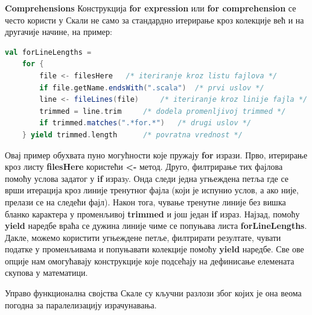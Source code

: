 \documentclass[12pt,oneside]{memoir}
\begin{document}
\begin{description}
\item \textbf{Comprehensions}
Конструкција \textbf{for expression} или \textbf{for comprehension} се често користи у Скали не само за стандардно итерирање кроз колекције већ и на другачије начине, на пример:
\begin{lstlisting}[language=Scala]
val forLineLengths =
	for {
		file <- filesHere 	/* iteriranje kroz listu fajlova */
		if file.getName.endsWith(".scala") 	/* prvi uslov */
		line <- fileLines(file) 	/* iteriranje kroz linije fajla */
		trimmed = line.trim 	/* dodela promenljivoj trimmed */
		if trimmed.matches(".*for.*") 	/* drugi uslov */
	} yield trimmed.length 		/* povratna vrednost */
\end{lstlisting}
Овај пример обухвата пуно могућности које пружају \textbf{for} изрази. Прво, итерирање кроз листу \textbf{filesHere} користећи \textbf{<-} метод. Друго, филтрирање тих фајлова помоћу услова задатог у \textbf{if} изразy. Онда следи једна угњеждена петља где се врши итерација кроз линије тренутног фајла (који је испунио услов, а ако није, прелази се на следећи фајл). Након тога, чување тренутне линије без вишка бланко карактера у променљивој \textbf{trimmed} и још један \textbf{if} израз. Најзад, помоћу \textbf{yield} наредбе враћа се дужина линије чиме се попуњава листа \textbf{forLineLengths}. Дакле, можемо користити угњеждене петље, филтрирати резултате, чувати податке у променљивама и попуњавати колекције помоћу \textbf{yield} наредбе. Све ове опције нам омогућавају конструкције које подсећају на дефинисање елемената скупова у математици.
\end{description}

\par Управо функционална својства Скале су кључни разлози због којих је она веома погодна за паралелизацију израчунавања. 

\end{document}
